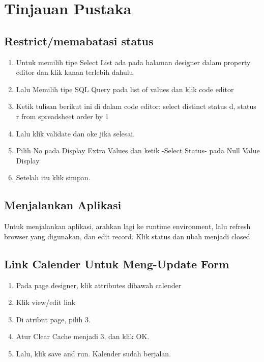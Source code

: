 \chapter{Tinjauan Pustaka}


\section{Restrict/memabatasi status}
\begin{enumerate}
    \item Untuk memilih tipe Select List ada pada halaman designer dalam property editor dan klik kanan terlebih dahulu
\item Lalu Memilih tipe SQL Query pada list of values dan klik code editor
\item Ketik tulisan berikut ini di dalam code editor:
select distinct status d, status r 
from spreadsheet
order by 1
\item	Lalu klik validate dan oke jika selesai.
\item	Pilih No pada Display Extra Values dan ketik -Select Status- pada Null Value Display
\item	Setelah itu klik simpan.

\end{enumerate}


\section{Menjalankan Aplikasi}
\par Untuk menjalankan aplikasi, arahkan lagi ke runtime environment, lalu refresh browser yang digunakan, dan edit record. Klik status dan ubah menjadi closed.



 \section{Link Calender Untuk Meng-Update Form}
 \begin{enumerate}
     \item 	Pada page designer, klik attributes dibawah calender
 \item 	Klik view/edit link
 \item 	Di atribut page, pilih 3.
 \item 	Atur Clear Cache menjadi 3, dan klik OK.
 \item 	Lalu, klik save and run. Kalender sudah berjalan.

 \end{enumerate}


